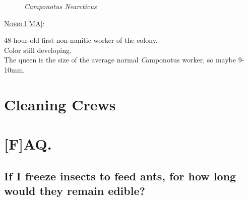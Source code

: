 
\begin{figure}

\label{fig:Noebl1[MA]-5-4-2019}


\caption{\textit{Camponotus Nearcticus}}
\end{figure}

\noindent\textsc{\ul{Noebl1[MA]}}:

\begin{displayquote}
  48-hour-old first non-nanitic worker of the colony.
  \\Color still developing.
  \\The queen is the size of the average normal \textit Camponotus worker, so maybe 9-10mm.
\end{displayquote}


\section{Cleaning Crews}
\section{[F]AQ.}


\subsection{If I freeze insects to feed ants, for how long would they remain edible?}


